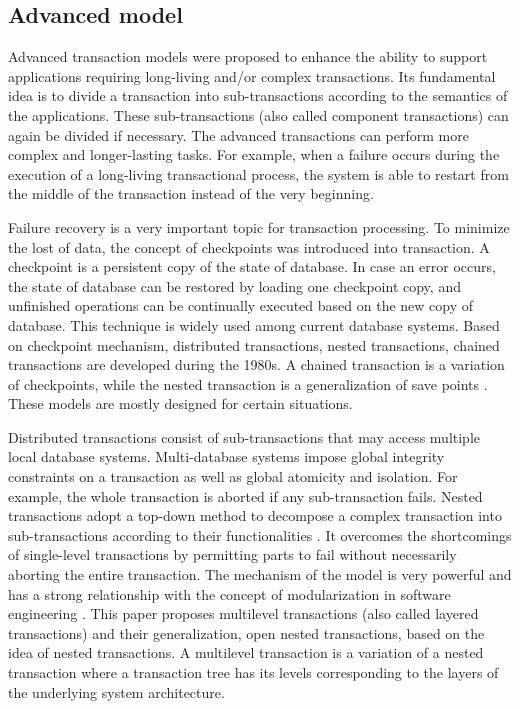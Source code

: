 \documentclass{sig-alternate-05-2015}
\begin{document}
\subsection{Advanced model}

Advanced transaction models were proposed to enhance the ability to support applications requiring long-living and/or complex transactions. Its fundamental idea is to divide a transaction into sub-transactions according to the semantics of the applications. These sub-transactions (also called component transactions) can again be divided if necessary. The advanced transactions can perform more complex and longer-lasting tasks. For example, when a failure occurs during the execution of a long-living transactional process, the system is able to restart from the middle of the transaction instead of the very beginning.

Failure recovery is a very important topic for transaction processing. To minimize the lost of data, the concept of checkpoints was introduced into transaction. A checkpoint is a persistent copy of the state of database. In case an error occurs, the state of database can be restored by loading one checkpoint copy, and unfinished operations can be continually executed based on the new copy of database. This technique is widely used among current database systems. Based on checkpoint mechanism, distributed transactions, nested transactions, chained transactions are developed during the 1980s. A chained transaction is a variation of checkpoints, while the nested transaction is a generalization of save points \cite{gray1992transaction}. These models are mostly designed for certain situations.


Distributed transactions consist of sub-transactions that may access multiple local database systems. Multi-database systems impose global integrity constraints on a transaction as well as global atomicity and isolation. For example, the whole transaction is aborted if any sub-transaction fails. Nested transactions adopt a top-down method to decompose a complex transaction into sub-transactions according to their functionalities \cite{moss1981nested}. It overcomes the shortcomings of single-level transactions by permitting parts to fail without necessarily aborting the entire transaction. The mechanism of the model is very powerful and has a strong relationship with the concept of modularization in software engineering \cite{gray1992transaction}. This paper \cite{weikum1992concepts} proposes multilevel transactions (also called layered transactions) and their generalization, open nested transactions, based on the idea of nested transactions. A multilevel transaction is a variation of a nested transaction where a transaction tree has its levels corresponding to the layers of the underlying system architecture.
\end{document}
